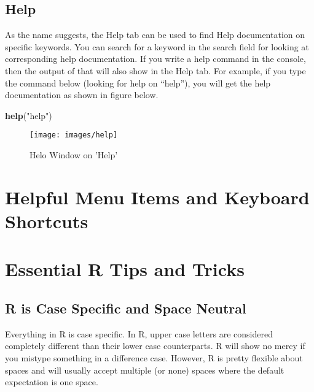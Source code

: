 \documentclass[
]{krantz}
\makeatletter
\newenvironment{Shaded}{\begin{snugshade}}{\end{snugshade}}
\newcommand{\KeywordTok}[1]{\textcolor[rgb]{0.27,0.27,0.27}{\textbf{#1}}}
\newcommand{\NormalTok}[1]{#1}
\newcommand{\StringTok}[1]{\textcolor[rgb]{0.5,0.5,0.5}{#1}}
\newenvironment{kframe}{%
\medskip{}
\setlength{\fboxsep}{.8em}
 \def\at@end@of@kframe{}%
 \ifinner\ifhmode%
  \def\at@end@of@kframe{\end{minipage}}%
  \begin{minipage}{\columnwidth}%
 \fi\fi%
 \def\FrameCommand##1{\hskip\@totalleftmargin \hskip-\fboxsep
 \colorbox{shadecolor}{##1}\hskip-\fboxsep
     \hskip-\linewidth \hskip-\@totalleftmargin \hskip\columnwidth}%
 \MakeFramed {\advance\hsize-\width
   \@totalleftmargin\z@ \linewidth\hsize
   \@setminipage}}%
 {\par\unskip\endMakeFramed%
 \at@end@of@kframe}
\renewenvironment{Shaded}{\begin{kframe}}{\end{kframe}}
\makeatother
\begin{document}
\hypertarget{help}{%
\subsection{Help}\label{help}}

As the name suggests, the Help tab can be used to find Help documentation on specific keywords. You can search for a keyword in the search field for looking at corresponding help documentation. If you write a help command in the console, then the output of that will also show in the Help tab. For example, if you type the command below (looking for help on ``help''), you will get the help documentation as shown in figure below.

\begin{Shaded}
\begin{Highlighting}[]
\KeywordTok{help}\NormalTok{(}\StringTok{"help"}\NormalTok{)}
\end{Highlighting}
\end{Shaded}

\begin{figure}

{\centering \texttt{[image: images/help]} 

}

\caption{Helo Window on 'Help'}\label{fig:unnamed-chunk-9}
\end{figure}

\hypertarget{helpful-menu-items-and-keyboard-shortcuts}{%
\section{Helpful Menu Items and Keyboard Shortcuts}\label{helpful-menu-items-and-keyboard-shortcuts}}

\hypertarget{essential-r-tips-and-tricks}{%
\section{Essential R Tips and Tricks}\label{essential-r-tips-and-tricks}}

\hypertarget{r-is-case-specific-and-space-neutral}{%
\subsection{R is Case Specific and Space Neutral}\label{r-is-case-specific-and-space-neutral}}

Everything in R is case specific. In R, upper case letters are considered completely different than their lower case counterparts. R will show no mercy if you mistype something in a difference case. However, R is pretty flexible about spaces and will usually accept multiple (or none) spaces where the default expectation is one space.
\end{document}
